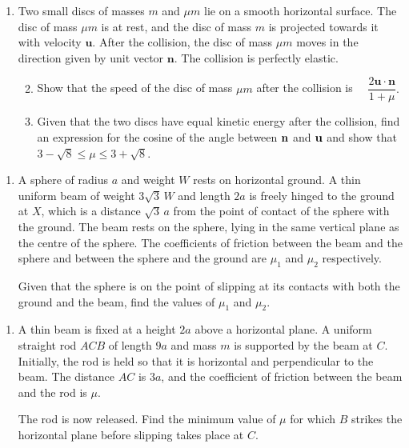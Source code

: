\documentclass[a4, 11pt]{report}
\newlength{\qspace}
\newcounter{qnumber}
\newenvironment{question}%
 {\vspace{\qspace}
  \begin{enumerate}[\bfseries 1\quad][10]%
    \setcounter{enumi}{\value{qnumber}}%
    \item%
 }
{
  \end{enumerate}
  \filbreak
  \stepcounter{qnumber}
 }
\newenvironment{questionparts}[1][1]%
 {
  \begin{enumerate}[\bfseries (i)]%
    \setcounter{enumii}{#1}
    \addtocounter{enumii}{-1}
    \setlength{\itemsep}{5mm}
    \setlength{\parskip}{8pt}
 }
 {
  \end{enumerate}
 }
\def\bn {\mathbf n}
\def\le{\leqslant}
\begin{document}
	
\begin{question}
Two small discs of masses $m$ and $\mu m$  
lie on a smooth horizontal surface.  
The disc of mass $\mu m$ is at rest,  
and the disc of mass $m$ is projected towards it with velocity $\mathbf{u}$.  
After the collision, the disc of mass $\mu m$ moves in the direction  
given by unit vector $\bn$. The collision is perfectly elastic. 
 
\begin{questionparts} 
\item
Show that  the speed of the disc of mass $\mu m$ after the collision  
is \ \ 
$ 
\dfrac {2\mathbf{u} \cdot \mathbf{n}}{1+\mu}. 
$ 
 
\item
 Given that  the two discs have equal kinetic energy  
after the collision, 
find an expression for the cosine of the angle between 
 $\bf n$ and $\bf u$ and show that  
$3-\sqrt8\le \mu \le 3+\sqrt8$.  
\end{questionparts} 
	\end{question}
	
\begin{question}	
A sphere of radius $a$ and weight $W$ rests  on horizontal ground.  
A thin uniform beam of weight $3\sqrt3\,W$ 
and length $2a$ is freely hinged to the ground at $X$,  
which is a distance ${\sqrt 3} \, a$  
from the point  of contact of the sphere  with the ground.  
The beam rests on the sphere, lying in the same vertical plane 
as the centre of the  sphere. 
The coefficients of friction between the beam and the sphere  
and between 
the sphere  and the ground are $\mu_1$ and $\mu_2$ respectively. 
 
Given that the sphere is on the point of slipping at its contacts  
with both the ground and the beam, 
find the values of $\mu_1$ and $\mu_2$. 
\end{question}


\begin{question}
A thin beam is fixed at a height $2a$ above a horizontal plane. 
A uniform straight rod $ACB$ of length $9a$ and mass $m$ 
is supported by the beam at $C$. Initially, the rod  is held  
so that it is horizontal and perpendicular to the beam. 
The distance $AC$ is $3a$, and 
the coefficient of friction between the beam and the rod is $\mu$. 
 
The rod is now released.  
Find the minimum value of $\mu$ for which $B$ 
strikes the horizontal plane  
before slipping takes place at $C$. 
\end{question}
	
\end{document}
